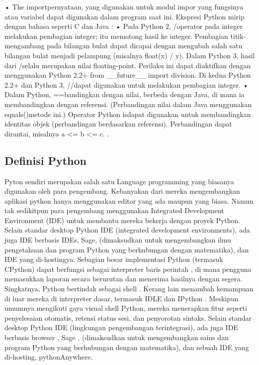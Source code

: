 •	The importpernyataan, yang digunakan untuk modul impor yang fungsinya atau variabel dapat digunakan dalam program saat ini.
	Ekspresi Python mirip dengan bahasa seperti C dan Java :
•	Pada Python 2, /operator pada integer melakukan pembagian integer; itu memotong hasil ke integer. Pembagian titik-mengambang pada bilangan bulat dapat dicapai dengan mengubah salah satu bilangan bulat menjadi pelampung (misalnya float(x) / y). Dalam Python 3, hasil dari /selalu merupakan nilai floating-point. Perilaku ini dapat diaktifkan dengan menggunakan Python 2.2+ from __future__ import division. Di kedua Python 2.2+ dan Python 3, //dapat digunakan untuk melakukan pembagian integer.
•	Dalam Python, ==bandingkan dengan nilai, berbeda dengan Java, di mana ia membandingkan dengan referensi. (Perbandingan nilai dalam Java menggunakan equals()metode ini.) Operator Python isdapat digunakan untuk membandingkan identitas objek (perbandingan berdasarkan referensi). Perbandingan dapat dirantai, misalnya a <= b <= c.
\cite{van2007python}.

\subsection{Definisi Python}
	Pyton sendiri merupakan salah satu Language programming yang biasanya digunakan oleh para pengembang. Kebanyakan dari mereka mengembangkan aplikasi python hanya menggunakan editor yang ada maupun yang biasa. Namun tak sedikitpun para pengembang menggunakan Integrated Development Environment (IDE) untuk membantu mereka bekerja dengan proyek Python. Selain standar desktop Python IDE (integrated development environments), ada juga IDE berbasis IDEs, Sage, (dimaksudkan untuk mengembangkan ilmu pengetahuan dan program Python yang berhubungan dengan matematika), dan IDE yang di-hostingya.
	Sebagian besar implementasi Python (termasuk CPython) dapat berfungsi sebagai interpreter baris perintah , di mana pengguna memasukkan laporan secara berurutan dan menerima hasilnya dengan segera. Singkatnya, Python bertindak sebagai shell . Kerang lain menambah kemampuan di luar mereka di interpreter dasar, termasuk IDLE dan IPython . Meskipun umumnya mengikuti gaya visual shell Python, mereka menerapkan fitur seperti penyelesaian otomatis, retensi status sesi, dan penyorotan sintaks.
	Selain standar desktop Python IDE (lingkungan pengembangan terintegrasi), ada juga IDE berbasis browser , Sage , (dimaksudkan untuk mengembangkan sains dan program Python yang berhubungan dengan matematika), dan sebuah IDE yang di-hosting, pythonAnywhere. \cite{van2007python}


